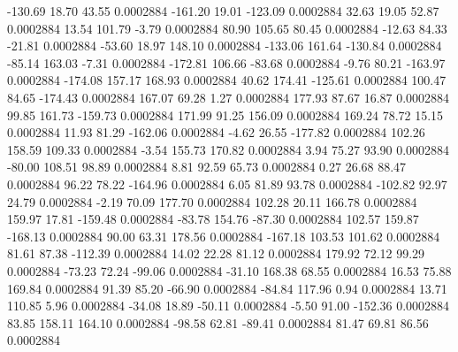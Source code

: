      -130.69       18.70       43.55     0.0002884
     -161.20       19.01     -123.09     0.0002884
       32.63       19.05       52.87     0.0002884
       13.54      101.79       -3.79     0.0002884
       80.90      105.65       80.45     0.0002884
      -12.63       84.33      -21.81     0.0002884
      -53.60       18.97      148.10     0.0002884
     -133.06      161.64     -130.84     0.0002884
      -85.14      163.03       -7.31     0.0002884
     -172.81      106.66      -83.68     0.0002884
       -9.76       80.21     -163.97     0.0002884
     -174.08      157.17      168.93     0.0002884
       40.62      174.41     -125.61     0.0002884
      100.47       84.65     -174.43     0.0002884
      167.07       69.28        1.27     0.0002884
      177.93       87.67       16.87     0.0002884
       99.85      161.73     -159.73     0.0002884
      171.99       91.25      156.09     0.0002884
      169.24       78.72       15.15     0.0002884
       11.93       81.29     -162.06     0.0002884
       -4.62       26.55     -177.82     0.0002884
      102.26      158.59      109.33     0.0002884
       -3.54      155.73      170.82     0.0002884
        3.94       75.27       93.90     0.0002884
      -80.00      108.51       98.89     0.0002884
        8.81       92.59       65.73     0.0002884
        0.27       26.68       88.47     0.0002884
       96.22       78.22     -164.96     0.0002884
        6.05       81.89       93.78     0.0002884
     -102.82       92.97       24.79     0.0002884
       -2.19       70.09      177.70     0.0002884
      102.28       20.11      166.78     0.0002884
      159.97       17.81     -159.48     0.0002884
      -83.78      154.76      -87.30     0.0002884
      102.57      159.87     -168.13     0.0002884
       90.00       63.31      178.56     0.0002884
     -167.18      103.53      101.62     0.0002884
       81.61       87.38     -112.39     0.0002884
       14.02       22.28       81.12     0.0002884
      179.92       72.12       99.29     0.0002884
      -73.23       72.24      -99.06     0.0002884
      -31.10      168.38       68.55     0.0002884
       16.53       75.88      169.84     0.0002884
       91.39       85.20      -66.90     0.0002884
      -84.84      117.96        0.94     0.0002884
       13.71      110.85        5.96     0.0002884
      -34.08       18.89      -50.11     0.0002884
       -5.50       91.00     -152.36     0.0002884
       83.85      158.11      164.10     0.0002884
      -98.58       62.81      -89.41     0.0002884
       81.47       69.81       86.56     0.0002884
